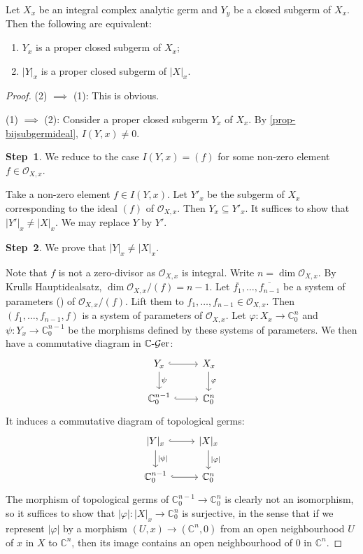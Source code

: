 \begin{thm}[Nullstellensatz]\label{thm-Nullstellensatz}
    Let $X_x$ be an integral complex analytic germ and $Y_y$ be a closed subgerm of $X_x$. Then the following are equivalent:
    \begin{enumerate}
        \item $Y_x$ is a proper closed subgerm of $X_x$;
        \item $|Y|_x$ is a proper closed subgerm of $|X|_x$. 
    \end{enumerate}
\end{thm}
\begin{proof}
    (2) $\implies$ (1): This is obvious.

    (1) $\implies$ (2): Consider a proper closed subgerm $Y_x$ of $X_x$. By \cref{prop-bijsubgermideal}, $I(Y,x)\neq 0$. 
    
    \textbf{Step~1}. We reduce to the case $I(Y,x)=(f)$ for some non-zero element $f\in \mathcal{O}_{X,x}$.

    Take a non-zero element $f\in I(Y,x)$. Let $Y'_x$ be the subgerm of $X_x$ corresponding to the ideal $(f)$ of $\mathcal{O}_{X,x}$. Then $Y_x\subseteq Y'_x$.  It suffices to show that $|Y'|_x\neq |X|_x$. We may replace $Y$ by $Y'$.

    \textbf{Step~2}. We prove that $|Y|_x\neq |X|_x$. 

    Note that $f$ is not a zero-divisor as $\mathcal{O}_{X,x}$ is integral. Write $n=\dim \mathcal{O}_{X,x}$.
    By Krulls Hauptidealsatz, $\dim \mathcal{O}_{X,x}/(f)=n-1$.
    Let $\overline{f_1},\ldots,\overline{f_{n-1}}$ be a system of parameters (\cite[\href{https://stacks.math.columbia.edu/tag/00KU}{Tag 00KU}]{stacks-project}) of $\mathcal{O}_{X,x}/(f)$. Lift them to $f_1,\ldots,f_{n-1}\in \mathcal{O}_{X,x}$. Then $(f_1,\ldots,f_{n-1},f)$ is a system of parameters of $\mathcal{O}_{X,x}$. Let $\varphi:X_x\rightarrow \mathbb{C}^n_0$ and $\psi:Y_x\rightarrow \mathbb{C}^{n-1}_0$ be the morphisms defined by these systems of parameters. We then have a commutative diagram in $\mathbb{C}\text{-}\mathcal{G}\mathrm{er}$:
    \[
        \begin{tikzcd}
            Y_x \arrow[r, hook] \arrow[d, "\psi"] & X_x \arrow[d, "\varphi"] \\
            \mathbb{C}^{n-1}_0 \arrow[r, hook]    & \mathbb{C}^{n}_0        
        \end{tikzcd}
    \]
    It induces a commutative diagram of topological germs:
    \[
        \begin{tikzcd}
            {|Y|_x} \arrow[r, hook] \arrow[d, "|\psi|"] & {|X|_x} \arrow[d, "|\varphi|"] \\
            \mathbb{C}^{n-1}_0 \arrow[r, hook]    & \mathbb{C}^{n}_0        
        \end{tikzcd}
    \]
The morphism of topological germs of $\mathbb{C}^{n-1}_0\rightarrow \mathbb{C}^{n}_0$ is clearly not an isomorphism, so it suffices to show that $|\varphi|:|X|_x\rightarrow \mathbb{C}^{n}_0   $ is surjective, in the sense that if we represent $|\varphi|$ by a morphism $(U,x)\rightarrow (\mathbb{C}^n,0)$ from an open neighbourhood $U$ of $x$ in $X$ to $\mathbb{C}^n$, then its image contains an open neighbourhood of $0$ in $\mathbb{C}^n$.


\end{proof}

